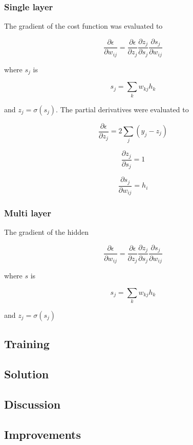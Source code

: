 \documentclass{IEEEtran}
\begin{document}
\subsubsection{Single layer}

The gradient of the cost function was evaluated to

\begin{equation}
  \frac{\partial \epsilon}{\partial w_{ij}} =
  \frac{\partial \epsilon}{\partial z_j}
  \frac{\partial z_j}{\partial s_j}
  \frac{\partial s_j}{\partial w_{ij}}
\end{equation}

where $s_j$ is

\begin{equation}
  s_j = \sum_{k}{w_{kj}h_k}
\end{equation}

and $z_j = \sigma(s_j)$. The partial derivatives were evaluated to

\begin{equation}
    \frac{\partial \epsilon}{\partial z_j} = 2\sum_j(y_j - z_j)
\end{equation}

\begin{equation}
    \frac{\partial z_j}{\partial s_j} = 1
\end{equation}

\begin{equation}
    \frac{\partial s_j}{\partial w_{ij}} = h_i
\end{equation}

\subsubsection{Multi layer}

The gradient of the hidden

\begin{equation}
  \frac{\partial \epsilon}{\partial w_{ij}} =
  \frac{\partial \epsilon}{\partial z_j}
  \frac{\partial z_j}{\partial s_j}
  \frac{\partial s_j}{\partial w_{ij}}
\end{equation}

where $s$ is

\begin{equation}
  s_j = \sum_{k}{w_{kj}h_k}
\end{equation}

and $z_j = \sigma(s_j)$

\subsection{Training}

\subsection{Solution}

\subsection{Discussion}

\subsection{Improvements}
\end{document}
